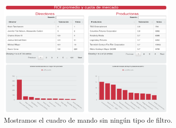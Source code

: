 \documentclass[11pt]{opticajnl}
\begin{document}
\begin{figure}[H]
\centering
\includegraphics[width=0.8\textwidth]{fotos/4.png}
\caption{Mostramos el cuadro de mando sin ningún tipo de filtro.}
\end{figure}
\end{document}
